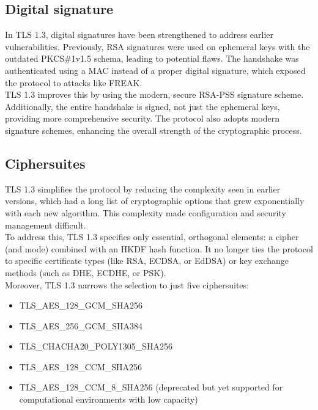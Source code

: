 \subsection{Digital signature}
In TLS 1.3, digital signatures have been strengthened to address
earlier vulnerabilities. Previously, RSA signatures were used on
ephemeral keys with the outdated PKCS\#1v1.5 schema, leading to
potential flaws. The handshake was authenticated using a MAC instead
of a proper digital signature, which exposed the protocol to attacks
like FREAK.\\
TLS 1.3 improves this by using the modern, secure RSA-PSS signature
scheme. Additionally, the entire handshake is signed, not just the
ephemeral keys, providing more comprehensive security. The protocol
also adopts modern signature schemes, enhancing the overall strength
of the cryptographic process.

\subsection{Ciphersuites}
TLS 1.3 simplifies the protocol by reducing the complexity seen in
earlier versions, which had a long list of cryptographic options that
grew exponentially with each new algorithm. This complexity made
configuration and security management difficult.\\
To address this, TLS 1.3 specifies only essential, orthogonal
elements: a cipher (and mode) combined with an HKDF hash function. It
no longer ties the protocol to specific certificate types (like RSA,
ECDSA, or EdDSA) or key exchange methods (such as DHE, ECDHE, or
PSK).\\
Moreover, TLS 1.3 narrows the selection to just five ciphersuites:
\begin{itemize}
  \item TLS\_AES\_128\_GCM\_SHA256
  \item TLS\_AES\_256\_GCM\_SHA384
  \item TLS\_CHACHA20\_POLY1305\_SHA256
  \item TLS\_AES\_128\_CCM\_SHA256
  \item TLS\_AES\_128\_CCM\_8\_SHA256 (deprecated but yet supported
    for computational environments with low capacity)
\end{itemize}

